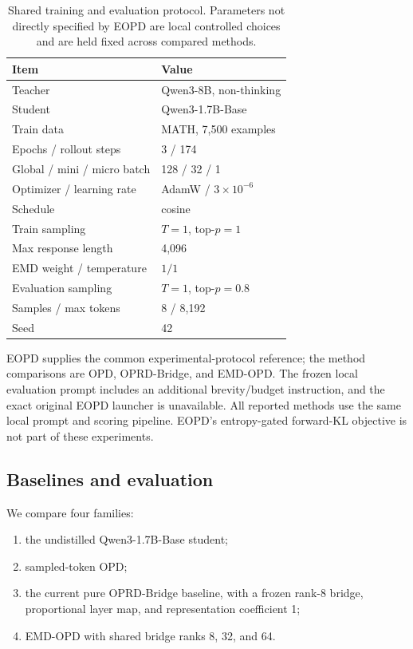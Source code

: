 \documentclass[10pt,twocolumn]{article}
\newcommand{\method}{\textsc{EMD-OPD}}
\begin{document}
\begin{table}[t]
\centering
\caption{Shared training and evaluation protocol. Parameters not directly specified by EOPD are local controlled choices and are held fixed across compared methods.}
\label{tab:protocol}
\small
\begin{tabular}{@{}ll@{}}
\toprule
Item & Value \\
\midrule
Teacher & Qwen3-8B, non-thinking \\
Student & Qwen3-1.7B-Base \\
Train data & MATH, 7,500 examples \\
Epochs / rollout steps & 3 / 174 \\
Global / mini / micro batch & 128 / 32 / 1 \\
Optimizer / learning rate & AdamW / $3\times10^{-6}$ \\
Schedule & cosine \\
Train sampling & $T=1$, top-$p=1$ \\
Max response length & 4,096 \\
EMD weight / temperature & $1 / 1$ \\
Evaluation sampling & $T=1$, top-$p=0.8$ \\
Samples / max tokens & 8 / 8,192 \\
Seed & 42 \\
\bottomrule
\end{tabular}
\end{table}

EOPD supplies the common experimental-protocol reference; the method comparisons are OPD, OPRD-Bridge, and \method{}. The frozen local evaluation prompt includes an additional brevity/budget instruction, and the exact original EOPD launcher is unavailable. All reported methods use the same local prompt and scoring pipeline. EOPD's entropy-gated forward-KL objective is not part of these experiments.

\subsection{Baselines and evaluation}

We compare four families:
\begin{enumerate}
    \item the undistilled Qwen3-1.7B-Base student;
    \item sampled-token OPD;
    \item the current pure OPRD-Bridge baseline, with a frozen rank-8 bridge, proportional layer map, and representation coefficient 1;
    \item \method{} with shared bridge ranks 8, 32, and 64.
\end{enumerate}
\end{document}
